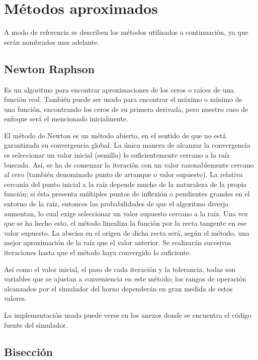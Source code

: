\section{Métodos aproximados}
\par A modo de referencia se describen los métodos utilizados a continuación, ya que serán nombrados mas adelante.

\subsection{Newton Raphson}
\par Es un algoritmo para encontrar aproximaciones de los ceros o raíces de una función real. También puede ser usado para encontrar el máximo o mínimo de una función, encontrando los ceros de su primera derivada, pero nuestro caso de enfoque será el mencionado inicialmente.

\par El método de Newton es un método abierto, en el sentido de que no está garantizada su convergencia global. La única manera de alcanzar la convergencia es seleccionar un valor inicial (semilla) lo suficientemente cercano a la raíz buscada. Así, se ha de comenzar la iteración con un valor razonablemente cercano al cero (también denominado punto de arranque o valor supuesto). La relativa cercanía del punto inicial a la raíz depende mucho de la naturaleza de la propia función; si ésta presenta múltiples puntos de inflexión o pendientes grandes en el entorno de la raíz, entonces las probabilidades de que el algoritmo diverja aumentan, lo cual exige seleccionar un valor supuesto cercano a la raíz. Una vez que se ha hecho esto, el método linealiza la función por la recta tangente en ese valor supuesto. La abscisa en el origen de dicha recta será, según el método, una mejor aproximación de la raíz que el valor anterior. Se realizarán sucesivas iteraciones hasta que el método haya convergido lo suficiente. 

\par Así como el valor inicial, el paso de cada iteración y la tolerancia, todas son variables que se ajustan a conveniencia en este método; los rangos de operación alcanzados por el simulador del horno dependerán en gran medida de estos valores.

\par La implementación usada puede verse en los anexos donde se encuentra el código fuente del simulador.

\subsection{Bisección}

